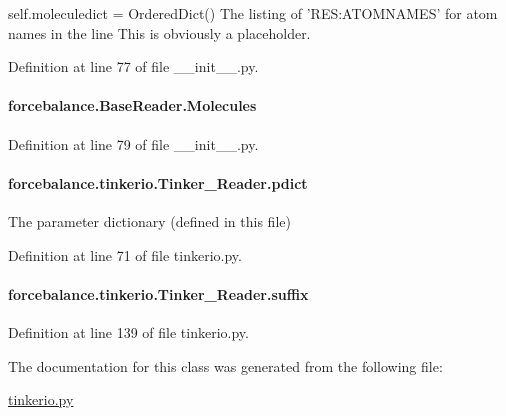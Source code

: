 self.\-moleculedict = Ordered\-Dict() The listing of 'R\-E\-S\-:A\-T\-O\-M\-N\-A\-M\-E\-S' for atom names in the line This is obviously a placeholder. 

Definition at line 77 of file \-\_\-\-\_\-init\-\_\-\-\_\-.\-py.

\hypertarget{classforcebalance_1_1BaseReader_a4369b5fb663a83b11602daa71db6862e}{
\paragraph[{Molecules}]{\setlength{\rightskip}{0pt plus 5cm}forcebalance.\-Base\-Reader.\-Molecules\hspace{0.3cm}{\ttfamily [inherited]}}}\label{classforcebalance_1_1BaseReader_a4369b5fb663a83b11602daa71db6862e}


Definition at line 79 of file \-\_\-\-\_\-init\-\_\-\-\_\-.\-py.

\hypertarget{classforcebalance_1_1tinkerio_1_1Tinker__Reader_a357973ff305fe5135067499292f32a37}{
\paragraph[{pdict}]{\setlength{\rightskip}{0pt plus 5cm}forcebalance.\-tinkerio.\-Tinker\-\_\-\-Reader.\-pdict}}\label{classforcebalance_1_1tinkerio_1_1Tinker__Reader_a357973ff305fe5135067499292f32a37}


The parameter dictionary (defined in this file) 



Definition at line 71 of file tinkerio.\-py.

\hypertarget{classforcebalance_1_1tinkerio_1_1Tinker__Reader_ad9a91824cf94ed13b39a115ebbd784c3}{
\paragraph[{suffix}]{\setlength{\rightskip}{0pt plus 5cm}forcebalance.\-tinkerio.\-Tinker\-\_\-\-Reader.\-suffix}}\label{classforcebalance_1_1tinkerio_1_1Tinker__Reader_ad9a91824cf94ed13b39a115ebbd784c3}


Definition at line 139 of file tinkerio.\-py.



The documentation for this class was generated from the following file\-:\begin{DoxyCompactItemize}
\item 
\hyperlink{tinkerio_8py}{tinkerio.\-py}\end{DoxyCompactItemize}

